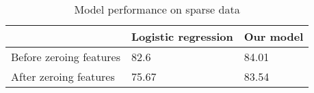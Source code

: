 \begin{table}[htbp]
\centering
\begin{tabular}{l|l|l}
 & \multicolumn{1}{c|}{Logistic regression} & \multicolumn{1}{c}{Our model} \\ \hline
Before zeroing features & 82.6 & 84.01 \\
After zeroing features & 75.67 & 83.54
\end{tabular}
\caption{\label{tab:widgets}Model performance on sparse data}
\end{table}
